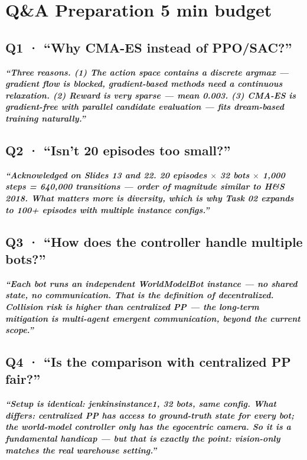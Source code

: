 \documentclass[11pt,a4paper]{article}
\newcommand{\say}[1]{%
    \par\vspace{0.3em}%
    \begingroup
    \leftskip=12pt
    \rightskip=8pt
    \color{thStrong}%
    \itshape\textbf{“#1”}%
    \par
    \endgroup
    \vspace{0.2em}
}
\begin{document}
\section{Q\&A Preparation \hfill \textcolor{thMuted}{\small 5 min budget}}

\subsection*{Q1 · ``Why CMA-ES instead of PPO/SAC?''}
\say{Three reasons. (1) The action space contains a discrete argmax — gradient flow is blocked, gradient-based methods need a continuous relaxation. (2) Reward is very sparse — mean 0.003. (3) CMA-ES is gradient-free with parallel candidate evaluation — fits dream-based training naturally.}

\subsection*{Q2 · ``Isn't 20 episodes too small?''}
\say{Acknowledged on Slides 13 and 22. 20 episodes $\times$ 32 bots $\times$ 1{,}000 steps = 640{,}000 transitions — order of magnitude similar to H\&S 2018. What matters more is diversity, which is why Task 02 expands to 100+ episodes with multiple instance configs.}

\subsection*{Q3 · ``How does the controller handle multiple bots?''}
\say{Each bot runs an independent WorldModelBot instance — no shared state, no communication. That is the definition of decentralized. Collision risk is higher than centralized PP — the long-term mitigation is multi-agent emergent communication, beyond the current scope.}

\subsection*{Q4 · ``Is the comparison with centralized PP fair?''}
\say{Setup is identical: jenkinsinstance1, 32 bots, same config. What differs: centralized PP has access to ground-truth state for every bot; the world-model controller only has the egocentric camera. So it is a \textbf{fundamental handicap} — but that is exactly the point: vision-only matches the real warehouse setting.}
\end{document}
